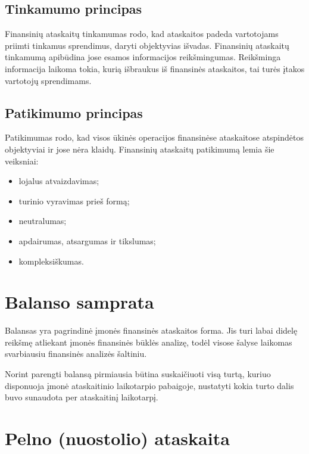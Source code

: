 \subsection{Tinkamumo principas}


Finansinių ataskaitų tinkamumas rodo, kad ataskaitos padeda vartotojams
priimti tinkamus sprendimus, daryti objektyvias išvadas. Finansinių
ataskaitų tinkamumą apibūdina jose esamos informacijos reikšmingumas.
Reikšminga informacija laikoma tokia, kurią išbraukus iš finansinės
ataskaitos, tai turės įtakos vartotojų sprendimams.

\subsection{Patikimumo principas}


Patikimumas rodo, kad visos ūkinės operacijos finansinėse ataskaitose
atspindėtos objektyviai ir jose nėra klaidų. Finansinių ataskaitų
patikimumą lemia šie veiksniai:
\begin{itemize}
  \item lojalus atvaizdavimas;
  \item turinio vyravimas prieš formą;
  \item neutralumas;
  \item apdairumas, atsargumas ir tikslumas;
  \item kompleksiškumas.
\end{itemize}

\section{Balanso samprata}


Balansas yra pagrindinė įmonės finansinės ataskaitos forma. Jis turi
labai didelę reikšmę atliekant įmonės finansinės būklės analizę,
todėl visose šalyse laikomas svarbiausiu finansinės analizės šaltiniu.

Norint parengti balansą pirmiausia būtina suskaičiuoti visą turtą, kuriuo
disponuoja įmonė ataskaitinio laikotarpio pabaigoje, nustatyti kokia
turto dalis buvo sunaudota per ataskaitinį laikotarpį.

\section{Pelno (nuostolio) ataskaita}

